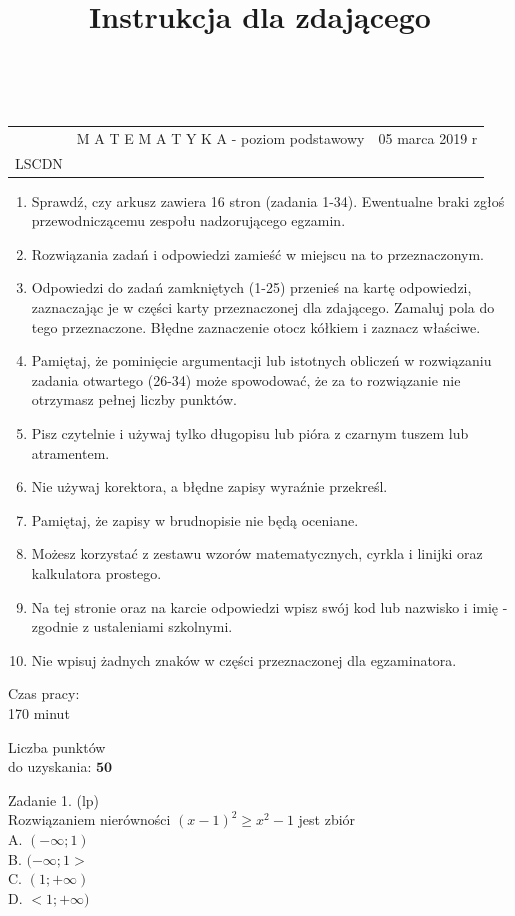 \documentclass[10pt]{article}
\title{Instrukcja dla zdającego }
\author{}
\date{}
\begin{document}
\maketitle
\(\qquad\)

\begin{center}
\begin{tabular}{|l|l|l}
\hline
 & M A T E M A T Y K A - poziom podstawowy & 05 marca 2019 r \\
LSCDN &  &  \\
\hline
\end{tabular}
\end{center}

\begin{enumerate}
  \item Sprawdź, czy arkusz zawiera 16 stron (zadania 1-34). Ewentualne braki zgłoś przewodniczącemu zespołu nadzorującego egzamin.
  \item Rozwiązania zadań i odpowiedzi zamieść w miejscu na to przeznaczonym.
  \item Odpowiedzi do zadań zamkniętych (1-25) przenieś na kartę odpowiedzi, zaznaczając je w części karty przeznaczonej dla zdającego. Zamaluj pola do tego przeznaczone. Błędne zaznaczenie otocz kółkiem i zaznacz właściwe.
  \item Pamiętaj, że pominięcie argumentacji lub istotnych obliczeń w rozwiązaniu zadania otwartego (26-34) może spowodować, że za to rozwiązanie nie otrzymasz pełnej liczby punktów.
  \item Pisz czytelnie i używaj tylko długopisu lub pióra z czarnym tuszem lub atramentem.
  \item Nie używaj korektora, a błędne zapisy wyraźnie przekreśl.
  \item Pamiętaj, że zapisy w brudnopisie nie będą oceniane.
  \item Możesz korzystać z zestawu wzorów matematycznych, cyrkla i linijki oraz kalkulatora prostego.
  \item Na tej stronie oraz na karcie odpowiedzi wpisz swój kod lub nazwisko i imię - zgodnie z ustaleniami szkolnymi.
  \item Nie wpisuj żadnych znaków w części przeznaczonej dla egzaminatora.
\end{enumerate}

Czas pracy:\\
170 minut

Liczba punktów\\
do uzyskania: \(\mathbf{5 0}\)

Zadanie 1. (lp)\\
Rozwiązaniem nierówności \((x-1)^{2} \geq x^{2}-1\) jest zbiór\\
A. \((-\infty ; 1)\)\\
B. \((-\infty ; 1>\)\\
C. \((1 ;+\infty)\)\\
D. \(<1 ;+\infty)\)
\end{document}
